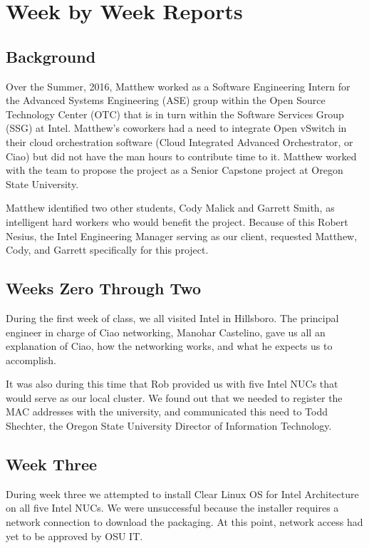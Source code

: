 \documentclass[10pt,onecolumn,journal,draftclsnofoot]{IEEEtran}
\begin{document}
\section{Week by Week Reports}

\subsection{Background}

Over the Summer, 2016, Matthew worked as a Software Engineering Intern for the
Advanced Systems Engineering (ASE) group within the Open Source Technology
Center (OTC) that is in turn within the Software Services Group (SSG) at Intel.
Matthew's coworkers had a need to integrate Open vSwitch in their cloud
orchestration software (Cloud Integrated Advanced Orchestrator, or Ciao) but did
not have the man hours to contribute time to it. Matthew worked with the team to
propose the project as a Senior Capstone project at Oregon State University.

Matthew identified two other students, Cody Malick and Garrett Smith, as
intelligent hard workers who would benefit the project. Because of this Robert
Nesius, the Intel Engineering Manager serving as our client, requested Matthew,
Cody, and Garrett specifically for this project.

\subsection{Weeks Zero Through Two}

During the first week of class, we all visited Intel in Hillsboro. The principal
engineer in charge of Ciao networking, Manohar Castelino, gave us all an
explanation of Ciao, how the networking works, and what he expects us to
accomplish.

It was also during this time that Rob provided us with five Intel NUCs that
would serve as our local cluster. We found out that we needed to register the
MAC addresses with the university, and communicated this need to Todd Shechter,
the Oregon State University Director of Information Technology.

\subsection{Week Three}

During week three we attempted to install Clear Linux OS for Intel
Architecture~\cite{clearlinux} on all five Intel NUCs. We were unsuccessful
because the installer requires a network connection to download the packaging.
At this point, network access had yet to be approved by OSU IT.
\end{document}
